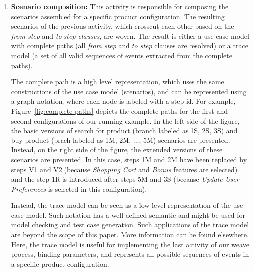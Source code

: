 \documentclass{acm_proc_article-sp}
\begin{document}
\begin{description}
\begin{enumerate}
 \item {\bf Scenario composition:} This activity is responsible for composing the scenarios assembled for a specific product configuration. 
 The resulting scenarios of the previous activity, which crosscut each other based on the \emph{from step} and \emph{to step clauses}, are woven. The 
 result is either a use case model with complete paths (all \emph{from step} and \emph{to step} clauses are resolved) or a trace model (a set of all valid sequences of events extracted from the complete paths). 
 
The complete path is a high level representation, which uses the same constructions of the use case model (scenarios), and can be represented using a graph notation, where each node is labeled with a step id. For example, Figure~\ref{fig:complete-paths} depicts the complete paths for the first and second configurations of our running example. In the left side of the figure,  the basic versions of search for product (branch labeled as 1S, 2S, 3S) and buy product (brach labeled as 1M, 2M, ..., 5M) scenarios are presented. Instead, on the right side of the figure, the extended versions of these scenarios are presented. In this case, steps 1M and 2M have been replaced by steps V1 and V2 (because \emph{Shopping Cart} and \emph{Bonus} features are selected) and the step  1R is introduced after steps 5M and 3S (because \emph{Update User Preferences} is selected in this configuration).
 
Instead, the trace model can be seen as a low level representation of the use case model. Such notation has a well defined semantic and might 
be used for model checking and test case generation. Such applications of the trace model are beyond the scope of this paper. More information 
can be found elsewhere\cite{csp-hoare,csp-roscoe,cfeitosa-sbmf-2006}. Here, the trace model is useful for implementing the last activity of our weave process, binding parameters, and 
represents all possible sequences of events in a specific product configuration. 



\end{enumerate}
\end{description}
\end{document}
